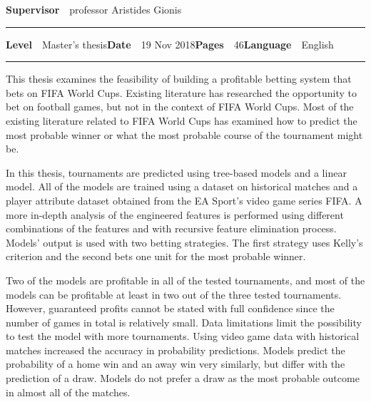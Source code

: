 \begin{spacing}{.88}
{{\fontsize{10.5pt}{10.5pt}\bfseries\sffamily\lsstyle Supervisor}~~{\small professor Aristides Gionis}

\vspace{-2.4mm}\rule{\textwidth}{.75pt}

{\fontsize{10.5pt}{10.5pt}\bfseries\sffamily\lsstyle Level}~~{\small Master's thesis}\hfill{\fontsize{10.5pt}{10.5pt}\bfseries\sffamily\lsstyle Date}~~{\small 19 Nov 2018}\hfill{\fontsize{10.5pt}{10.5pt}\bfseries\sffamily\lsstyle Pages}~~{\small 46}\hfill{\fontsize{10.5pt}{10.5pt}\bfseries\sffamily\lsstyle Language}~~{\small English}

\vspace{-2.4mm}\rule{\textwidth}{.75pt}

\vspace{6mm}

} %
\end{spacing}
\begin{spacing}{1.05}

\vspace{.8mm}

{\small
  This thesis examines the feasibility of building a profitable betting system that bets on FIFA World Cups. Existing literature has researched the opportunity to bet on football games, but not in the context of FIFA World Cups. Most of the existing literature related to FIFA World Cups has examined how to predict the most probable winner or what the most probable course of the tournament might be.

  In this thesis, tournaments are predicted using tree-based models and a linear model. All of the models are trained using a dataset on historical matches and a player attribute dataset obtained from the EA Sport's video game series FIFA. A more in-depth analysis of the engineered features is performed using different combinations of the features and with recursive feature elimination process. Models' output is used with two betting strategies. The first strategy uses Kelly's criterion and the second bets one unit for the most probable winner.

  Two of the models are profitable in all of the tested tournaments, and most of the models can be profitable at least in two out of the three tested tournaments. However, guaranteed profits cannot be stated with full confidence since the number of games in total is relatively small. Data limitations limit the possibility to test the model with more tournaments. Using video game data with historical matches increased the accuracy in probability predictions. Models predict the probability of a home win and an away win very similarly, but differ with the prediction of a draw. Models do not prefer a draw as the most probable outcome in almost all of the matches.
}

\vfill

\end{spacing}
